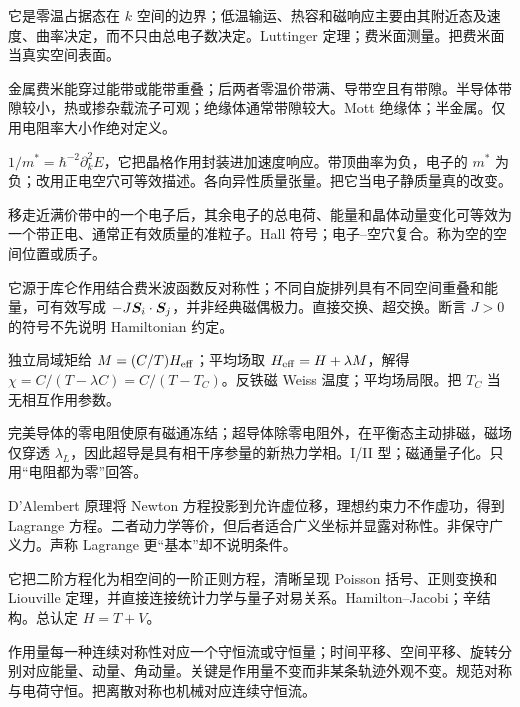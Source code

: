 {它是零温占据态在 $k$ 空间的边界；低温输运、热容和磁响应主要由其附近态及速度、曲率决定，而不只由总电子数决定。}{Luttinger 定理；费米面测量。}{把费米面当真实空间表面。}

{金属费米能穿过能带或能带重叠；后两者零温价带满、导带空且有带隙。半导体带隙较小，热或掺杂载流子可观；绝缘体通常带隙较大。}{Mott 绝缘体；半金属。}{仅用电阻率大小作绝对定义。}

{$1/m^*=\hbar^{-2}\partial_k^2E$，它把晶格作用封装进加速度响应。带顶曲率为负，电子的 $m^*$ 为负；改用正电空穴可等效描述。}{各向异性质量张量。}{把它当电子静质量真的改变。}

{移走近满价带中的一个电子后，其余电子的总电荷、能量和晶体动量变化可等效为一个带正电、通常正有效质量的准粒子。}{Hall 符号；电子--空穴复合。}{称为空的空间位置或质子。}

{它源于库仑作用结合费米波函数反对称性；不同自旋排列具有不同空间重叠和能量，可有效写成 $-J\bm{S}_i\cdot\bm{S}_j$，并非经典磁偶极力。}{直接交换、超交换。}{断言 $J>0$ 的符号不先说明 Hamiltonian 约定。}

{独立局域矩给 $M=(C/T)H_{\rm eff}$；平均场取 $H_{\rm eff}=H+\lambda M$，解得 $\chi=C/(T-\lambda C)=C/(T-T_C)$。}{反铁磁 Weiss 温度；平均场局限。}{把 $T_C$ 当无相互作用参数。}

{完美导体的零电阻使原有磁通冻结；超导体除零电阻外，在平衡态主动排磁，磁场仅穿透 $\lambda_L$，因此超导是具有相干序参量的新热力学相。}{I/II 型；磁通量子化。}{只用“电阻都为零”回答。}

{D'Alembert 原理将 Newton 方程投影到允许虚位移，理想约束力不作虚功，得到 Lagrange 方程。二者动力学等价，但后者适合广义坐标并显露对称性。}{非保守广义力。}{声称 Lagrange 更“基本”却不说明条件。}

{它把二阶方程化为相空间的一阶正则方程，清晰呈现 Poisson 括号、正则变换和 Liouville 定理，并直接连接统计力学与量子对易关系。}{Hamilton--Jacobi；辛结构。}{总认定 $H=T+V$。}

{作用量每一种连续对称性对应一个守恒流或守恒量；时间平移、空间平移、旋转分别对应能量、动量、角动量。关键是作用量不变而非某条轨迹外观不变。}{规范对称与电荷守恒。}{把离散对称也机械对应连续守恒流。}

